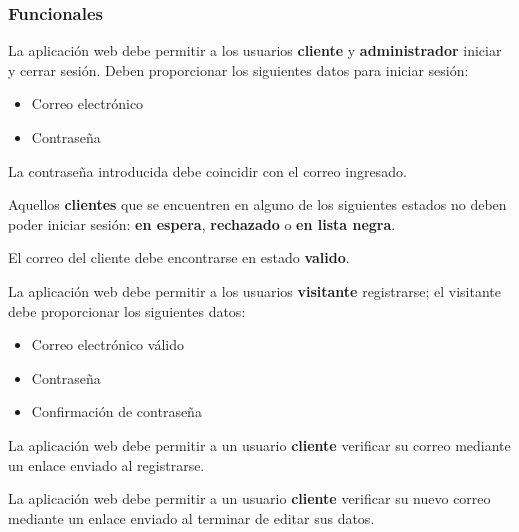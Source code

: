 %
%

\subsubsection{Funcionales}

{
  La aplicación web debe permitir a los usuarios \textbf{cliente} y
  \textbf{administrador} iniciar y cerrar sesión. Deben proporcionar los
  siguientes datos para iniciar sesión:
  \begin{itemize}
    \item Correo electrónico
    \item Contraseña
  \end{itemize}
}

{
  La contraseña introducida debe coincidir con el correo ingresado.
}

{
  Aquellos \textbf{clientes} que se encuentren en alguno de los siguientes
  estados no deben poder iniciar sesión: \textbf{en espera},
  \textbf{rechazado} o \textbf{en lista negra}.
}

{
  El correo del cliente debe encontrarse en estado \textbf{valido}.
}

{
  La aplicación web debe permitir a los usuarios \textbf{visitante}
  registrarse; el visitante debe proporcionar los siguientes datos:
  \begin{itemize}
    \item Correo electrónico válido
    \item Contraseña
    \item Confirmación de contraseña
  \end{itemize}
}

{
  La aplicación web debe permitir a un usuario \textbf{cliente} verificar
  su correo mediante un enlace enviado al registrarse.
}

{
  La aplicación web debe permitir a un usuario \textbf{cliente} verificar
  su nuevo correo mediante un enlace enviado al terminar de editar sus datos.
}


